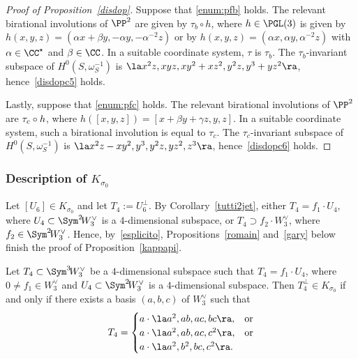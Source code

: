 \begin{proof}[Proof of Proposition~\ref{disdop}]
Suppose that \eqref{enum:pfb} holds. The relevant birational involutions of $\PP^2$ are given by $\tau_b\circ h$, where
$h\in\PGL(3)$ is given by $h(x,y,z)=(\alpha x+\beta y,-\alpha y,-\alpha^{-2} z)$ or by $h(x,y,z)=(\alpha x,\alpha y,\alpha^{-2} z)$ with $\alpha\in\CC^\star$ and $\beta\in\CC$. In a suitable coordinate system, $\tau$ is $\tau_b$.
The $\tau_b$-invariant subspace of $H^0({ S},\omega^{-1}_{{ S}})$ is $\la x^2z, xyz, xy^2+xz^2,y^2z, y^3+yz^2 \ra$, hence~\eqref{disdopc5} holds.

Lastly, suppose that \eqref{enum:pfc} holds. The relevant birational involutions of $\PP^2$ are $\tau_c\circ\nobreak h$, where
$h([x,y,z])=[x+\beta y+\gamma z,y, z]$. In a suitable coordinate system, such a birational involution is equal to $\tau_c$. The $\tau_c$-invariant subspace of $H^0({ S},\omega^{-1}_{{ S}})$ is \hbox{$\la x^2z-xy^2, y^3, y^2z, yz^2, z^3 \ra$}, hence~\eqref{disdopc6} holds.
\end{proof}

\subsubsection{Description of $K_{\sigma_0}$}\label{dimokappa}

Let $[U_6]\in K_{\sigma_0}$ and let $T_4:=U_6^{\bot}$. By Corollary~\ref{tutti2jet}, either $T_4=f_1\cdot U_4$, where $U_4\subset\Sym^2\! W_3^{\vee}$ is a $4$-dimensional subspace, or $T_4\supset f_2\cdot W_3^{\vee}$, where
$f_2\in \Sym^2 \!W_3^{\vee}$. Hence, by~\eqref{esplicito}, Propositions~\ref{romain} and~\ref{gary} below finish the proof of Proposition~\ref{kappapi}.

\begin{prop}\label{romain}
Let $T_4\subset \Sym^3 \!W^{\vee}_3$ be a $4$-dimensional subspace such that
$T_4=f_1\cdot U_4$, where $0\ne f_1\in W_3^{\vee}$ and $U_4\subset\Sym^2\! W_3^{\vee}$ is a $4$-dimensional subspace.
Then $T_4^{\bot}\in K_{\sigma_0}$ if and only if there exists a basis $(a,b,c)$ of $W^{\vee}_3$ such that
\[
T_4=
\begin{cases}
a\cdot\la a^2, ab,ac,bc\ra,& \text{or}\\
a\cdot\la a^2,ab,ac,c^2\ra, &\text{or}\\
a\cdot\la a^2,b^2,bc,c^2\ra.
\end{cases}
\]
\end{prop}

